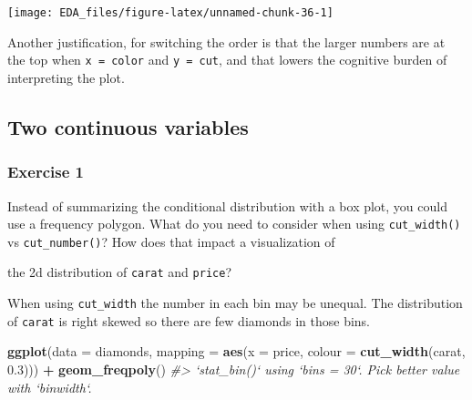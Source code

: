 \documentclass[]{book}
\newenvironment{Shaded}{\begin{snugshade}}{\end{snugshade}}
\newcommand{\CommentTok}[1]{\textcolor[rgb]{0.56,0.35,0.01}{\textit{#1}}}
\newcommand{\DataTypeTok}[1]{\textcolor[rgb]{0.13,0.29,0.53}{#1}}
\newcommand{\FloatTok}[1]{\textcolor[rgb]{0.00,0.00,0.81}{#1}}
\newcommand{\KeywordTok}[1]{\textcolor[rgb]{0.13,0.29,0.53}{\textbf{#1}}}
\newcommand{\NormalTok}[1]{#1}
\newcommand{\OperatorTok}[1]{\textcolor[rgb]{0.81,0.36,0.00}{\textbf{#1}}}
\newcommand{\StringTok}[1]{\textcolor[rgb]{0.31,0.60,0.02}{#1}}
\theoremstyle{plain}
\theoremstyle{remark}
\theoremstyle{definition}
\theoremstyle{definition}
\theoremstyle{definition}
\theoremstyle{remark}
\begin{document}
\begin{Shaded}
\end{Shaded}

\begin{center}\texttt{[image: EDA\_files/figure-latex/unnamed-chunk-36-1]} \end{center}

Another justification, for switching the order is that the larger
numbers are at the top when \texttt{x\ =\ color} and \texttt{y\ =\ cut},
and that lowers the cognitive burden of interpreting the plot.

\hypertarget{two-continuous-variables}{%
\subsection{Two continuous variables}\label{two-continuous-variables}}

\hypertarget{exercise-1-17}{%
\subsubsection{Exercise 1}\label{exercise-1-17}}

Instead of summarizing the conditional distribution with a box plot, you
could use a frequency polygon. What do you need to consider when using
\texttt{cut\_width()} vs \texttt{cut\_number()}? How does that impact a
visualization of

the 2d distribution of \texttt{carat} and \texttt{price}?

When using \texttt{cut\_width} the number in each bin may be unequal.
The distribution of \texttt{carat} is right skewed so there are few
diamonds in those bins.

\begin{Shaded}
\begin{Highlighting}[]
\KeywordTok{ggplot}\NormalTok{(}\DataTypeTok{data =}\NormalTok{ diamonds,}
       \DataTypeTok{mapping =} \KeywordTok{aes}\NormalTok{(}\DataTypeTok{x =}\NormalTok{ price,}
                     \DataTypeTok{colour =} \KeywordTok{cut_width}\NormalTok{(carat, }\FloatTok{0.3}\NormalTok{))) }\OperatorTok{+}
\StringTok{  }\KeywordTok{geom_freqpoly}\NormalTok{()}
\CommentTok{#> `stat_bin()` using `bins = 30`. Pick better value with `binwidth`.}
\end{Highlighting}
\end{Shaded}
\end{document}
